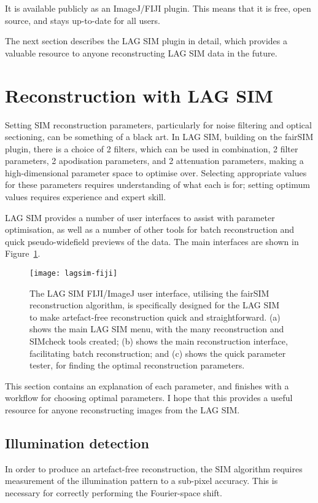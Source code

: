 It is available publicly as an ImageJ/FIJI plugin.
This means that it is free, open source, and stays up-to-date for all users. 

The next section describes the LAG SIM plugin in detail, which provides a valuable resource to anyone reconstructing LAG SIM data in the future.

\section{Reconstruction with LAG SIM} \label{sec:lagsimFiji}
Setting SIM reconstruction parameters, particularly for noise filtering and optical sectioning, can be something of a black art.
In LAG SIM, building on the fairSIM plugin, there is a choice of 2 filters, which can be used in combination, 2 filter parameters, 2 apodisation parameters, and 2 attenuation parameters, making a high-dimensional parameter space to optimise over. 
Selecting appropriate values for these parameters requires understanding of what each is for; setting optimum values requires experience and expert skill.

LAG SIM provides a number of user interfaces to assist with parameter optimisation, as well as a number of other tools for batch reconstruction and quick pseudo-widefield previews of the data. 
The main interfaces are shown in Figure~\ref{fig:lagsim-fiji-interface}. 

\begin{figure}[htbp!]
	\centering
		\texttt{[image: lagsim-fiji]}	
	\caption[LAG SIM: A Fiji interface makes artefact-free reconstruction quick and simple for non-expert users]{The LAG SIM FIJI/ImageJ user interface, utilising the fairSIM reconstruction algorithm, is specifically designed for the LAG SIM to make artefact-free reconstruction quick and straightforward. (a) shows the main LAG SIM menu, with the many reconstruction and SIMcheck tools created; (b) shows the main reconstruction interface, facilitating batch reconstruction; and (c) shows the quick parameter tester, for finding the optimal reconstruction parameters. } %
\label{fig:lagsim-fiji-interface}
\end{figure}

This section contains an explanation of each parameter, and finishes with a workflow for choosing optimal parameters.
I hope that this provides a useful resource for anyone reconstructing images from the LAG SIM.

\subsection{Illumination detection}
In order to produce an artefact-free reconstruction, the SIM algorithm requires measurement of the illumination pattern to a sub-pixel accuracy. 
This is necessary for correctly performing the Fourier-space shift. 

